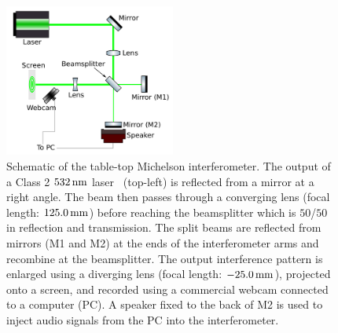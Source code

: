 \documentclass[paper-main.tex]{subfiles}
\begin{document}
\begin{figure}
	\includegraphics[width=0.5\textwidth]{figures/ifo_schematic_webcam_edit.pdf}
	\caption{\label{fig:ifo_schematic_webcam}
Schematic of the table-top Michelson interferometer. 
The output of a Class 2 $532\,{\rm nm}$ laser~\cite{ThorLabsIFO} (top-left) is reflected from a mirror at a right angle. The beam then passes through a converging lens (focal length: $125.0\,{\rm mm}$) before reaching the beamsplitter which is $50$/$50$ in reflection and transmission. 
The split beams are reflected from mirrors (M1 and M2) at the ends of the interferometer arms and recombine at the beamsplitter. 
The output interference pattern is enlarged using a diverging lens (focal length: $-25.0\,{\rm mm}$), projected onto a screen, and recorded using a commercial webcam connected to a computer (PC). 
A speaker fixed to the back of M2 is used to inject audio signals from the PC into the interferometer.
    }
\end{figure}
\end{document}
